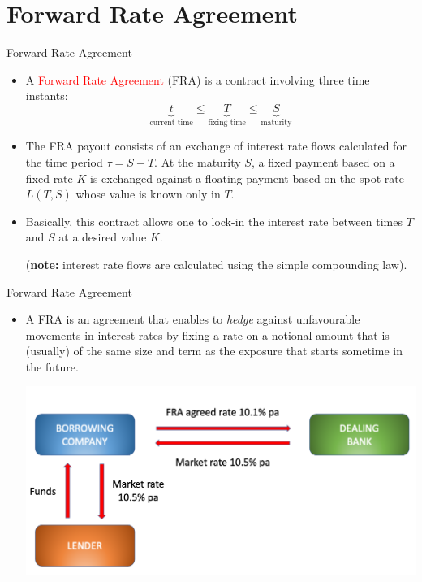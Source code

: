 \documentclass{beamer}
\begin{document}
\section{Forward Rate Agreement}
\begin{frame}{Forward Rate Agreement}
	\begin{itemize}	
		\item<1-> A \textcolor{red}{Forward Rate Agreement} (FRA) is a contract involving three time instants: %
		\begin{equation*}
			\underbrace{t}_{\text{current time}} \leq \underbrace{T}_{\text{fixing time}} \leq\underbrace{S}_{\text{maturity}}
		\end{equation*}
		\item<2-> The FRA payout consists of an exchange of interest rate flows calculated for the time period $\tau=S-T$. At the maturity $S$, a fixed payment based on a fixed rate $K$ is exchanged against a floating payment based on the spot rate $L(T, S)$ whose value is known only in $T$.
		\item<3-> Basically, this contract allows one to lock-in the interest rate between times $T$ and $S$ at a desired value $K$.
		 
		\noindent
		(\textbf{note:} interest rate flows are calculated using the simple compounding law).
	\end{itemize}
\end{frame}

\begin{frame}{Forward Rate Agreement}
	\begin{itemize}
	\item A FRA is an agreement that enables to \emph{hedge} against unfavourable movements in interest rates by fixing a rate on a notional amount that is (usually) of the same size and term as the exposure that starts sometime in the future. 
	\vfill
	\begin{center}
		\includegraphics[width=0.9\linewidth]{FRA_diagram}
	\end{center}
	\end{itemize}
\end{frame}
\end{document}
